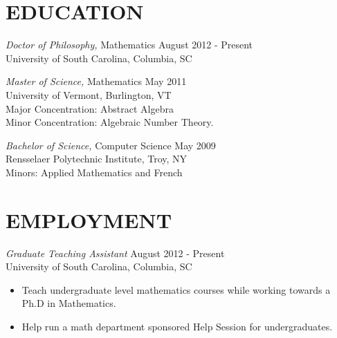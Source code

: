 \documentclass[line,overlapped]{res}
\begin{document}
\address{2807 Holt Drive}
\address{Columbia, SC 29205}

\begin{resume}
  
  
  \section{EDUCATION} 
          {\sl Doctor of Philosophy,} Mathematics \hfill August 2012 - Present\\
          University of South Carolina, Columbia, SC

          {\sl Master of Science,} Mathematics \hfill May 2011\\
          University of Vermont, Burlington, VT\\
          Major Concentration: Abstract Algebra\\
          Minor Concentration: Algebraic Number Theory.

          {\sl Bachelor of Science,} Computer Science \hfill May 2009\\
          Rensselaer Polytechnic Institute, Troy, NY\\
          Minors: Applied Mathematics and French

          \section{EMPLOYMENT}
                  {\sl Graduate Teaching Assistant} \hfill August 2012 - Present \\
                  University of South Carolina, Columbia, SC
                  \begin{itemize}  \itemsep -2pt %
                  \item
                    Teach undergraduate level mathematics courses while working towards a Ph.D in Mathematics.
                  \item 
                    Help run a math department sponsored Help Session for undergraduates.
                  \end{itemize}
                  

\end{resume}
\end{document}
